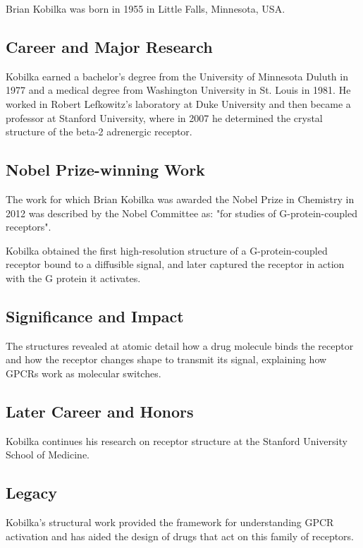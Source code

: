 Brian Kobilka was born in 1955 in Little Falls, Minnesota, USA.

\subsection*{Career and Major Research}

Kobilka earned a bachelor's degree from the University of Minnesota Duluth in 1977 and a medical degree from Washington University in St. Louis in 1981. He worked in Robert Lefkowitz's laboratory at Duke University and then became a professor at Stanford University, where in 2007 he determined the crystal structure of the beta-2 adrenergic receptor.

\subsection*{Nobel Prize-winning Work}

The work for which Brian Kobilka was awarded the Nobel Prize in Chemistry in 2012 was described by the Nobel Committee as: "for studies of G-protein-coupled receptors".

Kobilka obtained the first high-resolution structure of a G-protein-coupled receptor bound to a diffusible signal, and later captured the receptor in action with the G protein it activates.

\subsection*{Significance and Impact}

The structures revealed at atomic detail how a drug molecule binds the receptor and how the receptor changes shape to transmit its signal, explaining how GPCRs work as molecular switches.

\subsection*{Later Career and Honors}

Kobilka continues his research on receptor structure at the Stanford University School of Medicine.

\subsection*{Legacy}

Kobilka's structural work provided the framework for understanding GPCR activation and has aided the design of drugs that act on this family of receptors.

